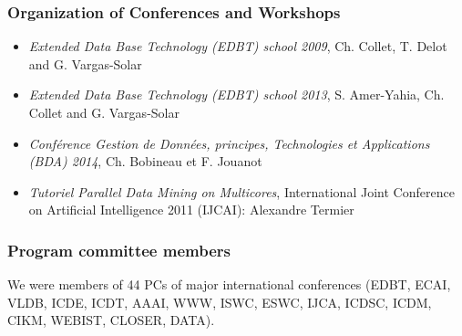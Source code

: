 \subsubsection*{Organization of Conferences and Workshops}

\begin{itemize}
\setlength{\itemindent}{-0.5cm}
\setlength{\itemsep}{-0.1cm}

\item \emph{Extended Data Base Technology (EDBT) school 2009}, Ch. Collet, T. Delot and G. Vargas-Solar

\item \emph{Extended Data Base Technology (EDBT) school 2013}, S.  Amer-Yahia, Ch. Collet and G. Vargas-Solar

\item \emph{Conf{\'e}rence Gestion de Donn{\'e}es, principes, Technologies et Applications (BDA) 2014}, Ch. Bobineau et F. Jouanot
 
 \item \emph{Tutoriel Parallel Data Mining on Multicores}, International Joint Conference on Artificial Intelligence  2011 (IJCAI): Alexandre Termier

\end{itemize}

\subsubsection*{Program committee members}

We were members of 44 PCs of major international conferences (EDBT, ECAI, VLDB, ICDE, ICDT, AAAI, WWW, ISWC, ESWC, IJCA, ICDSC, ICDM, CIKM, WEBIST, CLOSER, DATA).   



